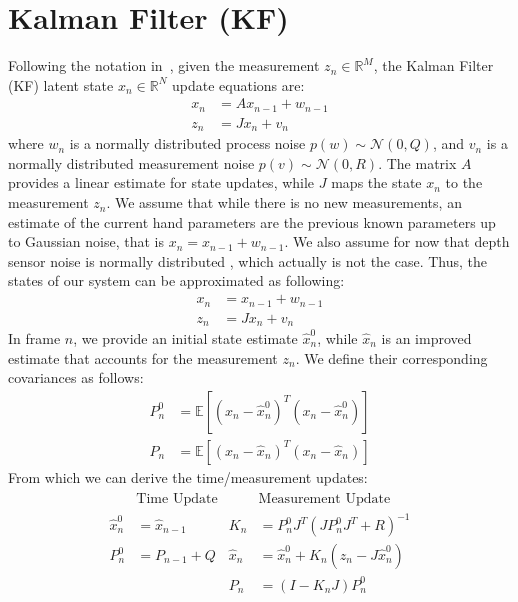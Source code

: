 \appendix
\section{Kalman Filter (KF)} 
\label{app:kalman}
Following the notation in~\cite{welch1995introduction}, given the measurement $z_n \in \mathbb{R}^M$, the Kalman Filter (KF) latent state $x_n \in \mathbb{R}^N$ update equations are:
% 
\begin{align}
x_n &= A x_{n - 1} +  w_{n - 1} \\
z_n &= J x_n + v_n
\end{align}
% 
where $w_n$ is a normally distributed process noise $p(w) \sim \mathcal{N}(0, Q)$, and $v_n$ is a normally distributed measurement noise $p(v) \sim \mathcal{N}(0, R)$. The matrix $A$ provides a linear estimate for state updates, while $J$ maps the state $x_n$ to the measurement $z_n$.
We assume that while  there is no new measurements, an estimate of the current hand parameters are the previous known parameters up to Gaussian noise, that is $x_n = x_{n-1} + w_{n-1}$. We also assume for now that depth sensor noise is normally distributed , which actually is not the case. Thus, the states of our system can be approximated as following:
% 
\begin{align}
x_n &= x_{n - 1} + w_{n - 1} \\
z_n &= J x_n + v_n
\end{align}
% 
In frame $n$, we provide an initial state estimate $\hat{x}_n^0$, while $\hat{x}_n$ is an improved estimate that accounts for the measurement $z_n$. We define their corresponding covariances as follows: 
% 
\begin{align}
P_n^0 &= \mathbb{E}[(x_n - \hat{x}_n^0)^T(x_n - \hat{x}_n^0)]\\
P_n   &= \mathbb{E}[(x_n - \hat{x}_n)^T(x_n - \hat{x}_n)]
\end{align}
% 
From which we can derive the time/measurement updates:
% 
\begin{gather}
\begin{aligned}
&\text{Time Update}                 &       &\text{Measurement Update} \\
\hat{x}_n^0 &= \hat{x}_{n - 1}      &       K_n &= P_n^0 J^T (J P_n^0 J^T + R)^{-1}\\
P_n^0 &= P_{n - 1} + Q              &       \hat{x}_n &= \hat{x}_n^0 + K_n (z_n - J \hat{x}_n^0) \\
&                                   &       P_n &= (I - K_n J) P_n^0 \\
\end{aligned}
\label{eq:kalman}
\end{gather}



